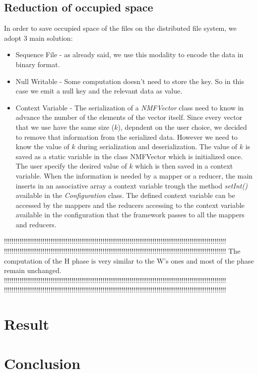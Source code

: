 \documentclass[a4paper,12pt]{article}
\newcommand{\METHOD}[1] {\textit{#1}}
\newcommand{\CLASS}[1] {\textit{#1}}
\begin{document}
\subsection{Reduction of occupied space}

In order to save occupied space of the files on the distributed file system, we adopt 3 main solution:
\begin{itemize}

  \item Sequence File - as already said, we use this modality to encode the data in binary format. 
  
  \item Null Writable - Some computation doesn't need to store the key. So in this case we emit a null key and the relevant data as value.
  
  \item Context Variable - The serialization of a \CLASS{NMFVector} class need to know in advance the number of the elements of the vector itself. Since every vector that we use have the same size ($k$), depndent on the user choice, we decided to remove that information from the serialized data. However we need to know the value of $k$ during serialization and deserialization. The value of $k$ is saved as a static variable in the class NMFVector which is initialized once. The user specify the desired value of $k$ which is then saved in a context variable. When the information is needed by a mapper or a reducer, the main inserts in an associative array a context variable trough the method \METHOD{setInt()} available in the \CLASS{Configuration} class. The defined context variable can be accessed by the mappers and the reducers accessing to the context variable available in the configuration that the framework passes to all the mappers and reducers.

\end{itemize}








!!!!!!!!!!!!!!!!!!!!!!!!!!!!!!!!!!!!!!!!!!!!!!!!!!!!!!!!!!!!!!!!!!!!!!!!!!!!!!!!!!!!!!!!!!!!!!!!!!!!!!!!!!!!!!!!!!!
!!!!!!!!!!!!!!!!!!!!!!!!!!!!!!!!!!!!!!!!!!!!!!!!!!!!!!!!!!!!!!!!!!!!!!!!!!!!!!!!!!!!!!!!!!!!!!!!!!!!!!!!!!!!!!!!!!!
The computation of the H phase is very similar to the W's ones and
most of the phase remain unchanged.
!!!!!!!!!!!!!!!!!!!!!!!!!!!!!!!!!!!!!!!!!!!!!!!!!!!!!!!!!!!!!!!!!!!!!!!!!!!!!!!!!!!!!!!!!!!!!!!!!!!!!!!!!!!!!!!!!!!
!!!!!!!!!!!!!!!!!!!!!!!!!!!!!!!!!!!!!!!!!!!!!!!!!!!!!!!!!!!!!!!!!!!!!!!!!!!!!!!!!!!!!!!!!!!!!!!!!!!!!!!!!!!!!!!!!!!

\section{Result}

\section{Conclusion}



\nocite{*}




\end{document}
